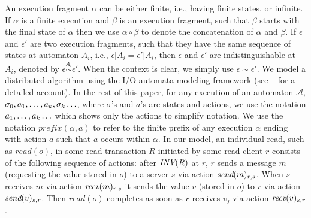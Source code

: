 {%
%
An execution fragment $\alpha$ %
can be either finite, i.e., having finite states, or infinite.
If $\alpha$ is a finite execution and $\beta$ is an execution fragment, such that $\beta$ starts with the final state of $\alpha$ then we use $\alpha \circ \beta$ to denote the concatenation of $\alpha$ and $\beta$.
If $\epsilon$ and $\epsilon'$ are two execution fragments, such that they have the same sequence of states at automaton $A_i$, i.e., $\epsilon|A_i = \epsilon'|A_i$, then $\epsilon$ and $\epsilon'$ are indistinguishable at $A_i$, denoted by $\epsilon \stackrel{A_i}{\sim} \epsilon'$. When the context is clear, we simply use $\epsilon \sim \epsilon'$. 
}
We model a distributed algorithm using the I/O automata modeling framework (see ~\cite{Lynch1996} for a detailed account).
In the rest of this paper, for any execution of an automaton $\mathcal{A}$, 
$\finiteprefix{k-1}{k}\ldots$, where $\sigma$'s and $a$'s are states and actions,
we use the notation $\finiteprefixt{k-1}{k}\ldots$ which shows only the actions to simplify notation. 
We use the notation $\textit{prefix}(\alpha, a)$ to refer to the finite prefix of any execution $\alpha$ ending with action  $a$ such that $a$ occurs within $\alpha$.
In our model, an individual read, such as $read(o)$, in some read transaction $R$ initiated by some read client $r$ consists of the following sequence of actions: after $\INV{R}$ at $r$, $r$ sends a message $m$ (requesting the value stored in $o$) to a server $s$ via action $\send{m}{r, s}$. When  $s$ receives $m$ via  action $\recv{m}{r, s}$ it sends the value $v$ (stored in $o$) to $r$  via action $\send{v}{s, r}$. Then $read(o)$ completes as soon as $r$ receives $v_j$ via action  $\recv{v}{s, r}$. 

